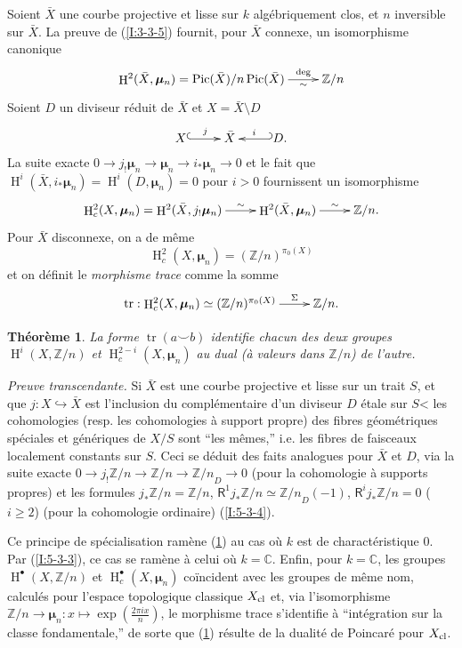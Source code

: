 \documentclass{book}
\DeclareMathOperator{\h}{H}
\DeclareMathOperator{\pic}{Pic}
\DeclareMathOperator{\tr}{tr}
\newcommand{\dC}{\mathbb{C}}
\newcommand{\dmu}{{\bm\mu}}%
\newcommand{\dZ}{\mathbb{Z}}
\newcommand{\R}{\mathsf{R}}
\newtheorem{theorem}[subsubsection]{Théorème}
\begin{document}
\subsubsection{}\label{I:6-2-1}

Soient $\bar X$ une courbe projective et lisse sur $k$ algébriquement clos, et 
$n$ inversible sur $\bar X$. La preuve de (\ref{I:3-3-5}) fournit, pour 
$\bar X$ connexe, un isomorphisme canonique 
\[\xymatrix{
  \h^2(\bar X,\dmu_n) = \pic(\bar X)/n\pic(\bar X) \ar[r]^-{\deg}_-{\sim}
    & \dZ/n
}\]
Soient $D$ un diviseur réduit de $\bar X$ et $X=\bar X\setminus D$ 
\[\xymatrix{
  X \ar@{^{(}->}[r]^-j 
    & \bar X 
    & \ar@{_{(}->}[l]_-i D \text{.}
}\]
La suite exacte $0\to j_! \dmu_n \to \dmu_n\to i_* \dmu_n\to 0$ et le fait que 
$\h^i(\bar X,i_*\dmu_n) = \h^i(D,\dmu_n)=0$ pour $i>0$ fournissent un 
isomorphisme 
\[\xymatrix{
  \h_c^2(X,\dmu_n) = \h^2(\bar X,j_! \dmu_n) \ar[r]^-\sim 
    & \h^2(\bar X,\dmu_n) \ar[r]^-\sim 
    & \dZ/n \text{.}
}\]
Pour $\bar X$ disconnexe, on a de même 
\[
  \h_c^2(X,\dmu_n) = (\dZ/n)^{\pi_0(X)}
\]
et on définit le \emph{morphisme trace} comme la somme 
\[\xymatrix{
  \tr : \h_c^2(X,\dmu_n) \simeq (\dZ/n)^{\pi_0(X)} \ar[r]^-\Sigma
    & \dZ/n\text{.}
}\]





\begin{theorem}\label{I:6-2-2}
La forme $\tr(a\smallsmile b)$ identifie chacun des deux groupes $\h^i(X,\dZ/n)$ 
et $\h_c^{2-i}(X,\dmu_n)$ au dual (à valeurs dans $\dZ/n$) de l'autre. 
\end{theorem}

\emph{Preuve transcendante.} Si $\bar X$ est une courbe projective et lisse sur 
un trait $S$, et que $j:X\hookrightarrow \bar X$ est l'inclusion du 
complémentaire d'un diviseur $D$ étale sur $S$< les cohomologies (resp. 
les cohomologies à support propre) des fibres géométriques spéciales et 
génériques de $X/S$ sont ``les mêmes,'' i.e. les fibres de faisceaux 
localement constants sur $S$. Ceci se déduit des faits analogues pour 
$\bar X$ et $D$, via la suite exacte $0\to j_! \dZ/n\to\dZ/n\to {\dZ/n}_D\to 0$ 
(pour la cohomologie à supports propres) et les formules $j_*\dZ/n = \dZ/n$, 
$\R^1 j_* \dZ/n \simeq {\dZ/n}_D(-1)$, $\R^i j_*\dZ/n = 0$ ($i\geqslant 2$) 
(pour la cohomologie ordinaire) (\ref{I:5-3-4}). 

Ce principe de spécialisation ramène (\ref{I:6-2-2}) au cas où $k$ est de 
charactéristique $0$. Par (\ref{I:5-3-3}), ce cas se ramène à celui où 
$k=\dC$. Enfin, pour $k=\dC$, les groupes $\h^\bullet(X,\dZ/n)$ et 
$\h_c^\bullet(X,\dmu_n)$ coïncident avec les groupes de même nom, calculés 
pour l'espace topologique classique $X_{\textnormal{cl}}$ et, via 
l'isomorphisme $\dZ/n\to \dmu_n: x\mapsto \exp\left(\frac{2\pi i x}{n}\right)$, 
le morphisme trace s'identifie à ``intégration sur la classe fondamentale,'' 
de sorte que (\ref{I:6-2-2}) résulte de la dualité de Poincaré pour 
$X_{\textnormal{cl}}$. 
\end{document}
